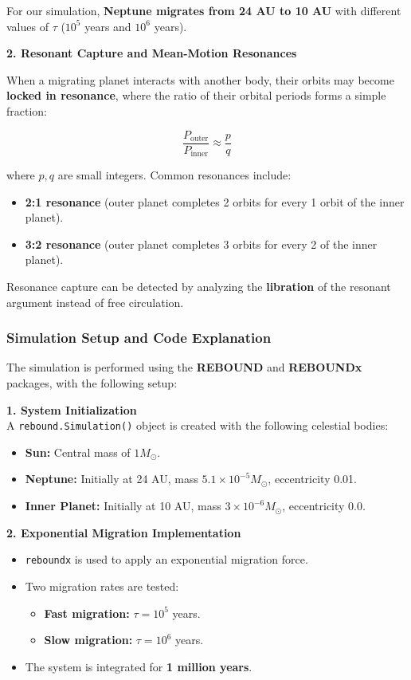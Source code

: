\documentclass[12pt,a4paper]{article}
\begin{document}
For our simulation, \textbf{Neptune migrates from 24 AU to 10 AU} with different values of \( \tau \) (\( 10^5 \) years and \( 10^6 \) years). 

\textbf{2. Resonant Capture and Mean-Motion Resonances}

When a migrating planet interacts with another body, their orbits may become \textbf{locked in resonance}, where the ratio of their orbital periods forms a simple fraction:

\begin{equation}
    \frac{P_{\text{outer}}}{P_{\text{inner}}} \approx \frac{p}{q}
\end{equation}

where \( p, q \) are small integers. Common resonances include:
\begin{itemize}
    \item \textbf{2:1 resonance} (outer planet completes 2 orbits for every 1 orbit of the inner planet).
    \item \textbf{3:2 resonance} (outer planet completes 3 orbits for every 2 of the inner planet).
\end{itemize}

Resonance capture can be detected by analyzing the \textbf{libration} of the resonant argument instead of free circulation.

\subsubsection{Simulation Setup and Code Explanation}

The simulation is performed using the \textbf{REBOUND} and \textbf{REBOUNDx} packages, with the following setup:

\textbf{1. System Initialization}
\\ A \texttt{rebound.Simulation()} object is created with the following celestial bodies:
\begin{itemize}
    \item \textbf{Sun:} Central mass of \( 1 M_{\odot} \).
    \item \textbf{Neptune:} Initially at 24 AU, mass \( 5.1 \times 10^{-5} M_{\odot} \), eccentricity 0.01.
    \item \textbf{Inner Planet:} Initially at 10 AU, mass \( 3 \times 10^{-6} M_{\odot} \), eccentricity 0.0.
\end{itemize}

\textbf{2. Exponential Migration Implementation}
\begin{itemize}
    \item \texttt{reboundx} is used to apply an exponential migration force.
    \item Two migration rates are tested:
    \begin{itemize}
        \item \textbf{Fast migration:} \( \tau = 10^5 \) years.
        \item \textbf{Slow migration:} \( \tau = 10^6 \) years.
    \end{itemize}
    \item The system is integrated for \textbf{1 million years}.
\end{itemize}
\end{document}

